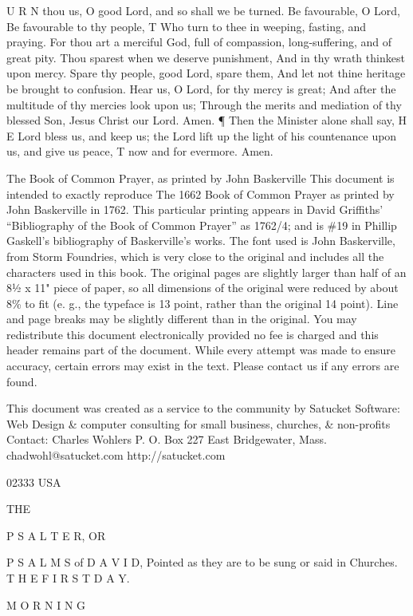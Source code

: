 U R N thou us, O good Lord, and so shall we be turned. Be favourable, O Lord, Be favourable to thy people, T Who turn to thee in weeping, fasting, and praying. For thou art a merciful God, full of compassion, long-suffering, and of great pity. Thou sparest when we deserve punishment, And in thy wrath thinkest upon mercy. Spare thy people, good Lord, spare them, And let not thine heritage be brought to confusion. Hear us, O Lord, for thy mercy is great; And after the multitude of thy mercies look upon us; Through the merits and mediation of thy blessed Son, Jesus Christ our Lord. Amen. ¶ Then the Minister alone shall say, H E Lord bless us, and keep us; the Lord lift up the light of his countenance upon us, and give us peace, T now and for evermore. Amen.


The Book of Common Prayer, as printed by John Baskerville This document is intended to exactly reproduce The 1662 Book of Common Prayer as printed by John Baskerville in 1762. This particular printing appears in David Griffiths' “Bibliography of the Book of Common Prayer” as 1762/4; and is \#19 in Phillip Gaskell's bibliography of Baskerville's works. The font used is John Baskerville, from Storm Foundries, which is very close to the original and includes all the characters used in this book. The original pages are slightly larger than half of an 8½ x 11" piece of paper, so all dimensions of the original were reduced by about 8\% to fit (e. g., the typeface is 13 point, rather than the original 14 point). Line and page breaks may be slightly different than in the original. You may redistribute this document electronically provided no fee is charged and this header remains part of the document. While every attempt was made to ensure accuracy, certain errors may exist in the text. Please contact us if any errors are found.

This document was created as a service to the community by Satucket Software: Web Design \& computer consulting for small business, churches, \& non-profits Contact: Charles Wohlers P. O. Box 227 East Bridgewater, Mass. chadwohl@satucket.com http://satucket.com

02333 USA

THE

P S A L T E R, OR

P S A L M S of D A V I D, Pointed as they are to be sung or said in Churches. T H E F I R S T D A Y.

M O R N I N G

